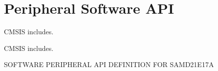 \hypertarget{group___s_a_m_d21_e17_a__api}{}\section{Peripheral Software A\+PI}
\label{group___s_a_m_d21_e17_a__api}


C\+M\+S\+IS includes.  


C\+M\+S\+IS includes. 

S\+O\+F\+T\+W\+A\+RE P\+E\+R\+I\+P\+H\+E\+R\+AL A\+PI D\+E\+F\+I\+N\+I\+T\+I\+ON F\+OR S\+A\+M\+D21\+E17A 
